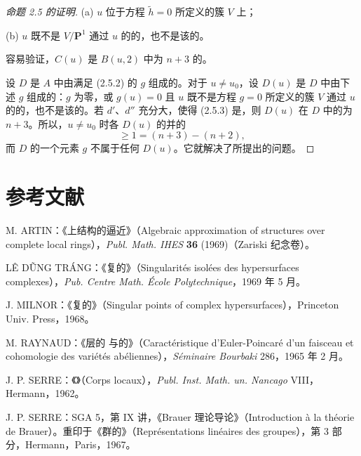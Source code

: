 \begin{proof}[命题 2.5 的证明]
(a) $u$ 位于方程 $\widetilde h=0$ 所定义的簇 $V$ 上；

(b) $u$ 既不是 $V/\mathbf P^1$ 通过 $u$ 的的，也不是该的。

容易验证，$C(u)$ 是 $B(u,2)$ 中为 $n+3$ 的。

设 $D$ 是 $A$ 中由满足 (2.5.2) 的 $g$ 组成的。对于 $u\ne u_0$，设 $D(u)$ 是 $D$ 中由下述 $g$ 组成的：$g$ 为零，或 $g(u)=0$ 且 $u$ 既不是方程 $g=0$ 所定义的簇 $V$ 通过 $u$ 的的，也不是该的。若 $d'$、$d''$ 充分大，使得 (2.5.3) 是，则 $D(u)$ 在 $D$ 中的为 $n+3$。所以，$u\ne u_0$ 时各 $D(u)$ 的并的
\[
\geq1=(n+3)-(n+2),
\]
而 $D$ 的一个元素 $g$ 不属于任何 $D(u)$。它就解决了所提出的问题。
\end{proof}

\section*{参考文献}
\begin{enumerate}[label={[\arabic*]}]
\item M. ARTIN：《上结构的逼近》（Algebraic approximation of structures over complete local rings），\textit{Publ. Math. IHES} \textbf{36} (1969)（Zariski 纪念卷）。
\item LÊ DŨNG TRÁNG：《复的》（Singularités isolées des hypersurfaces complexes），\textit{Pub. Centre Math. École Polytechnique}，1969 年 5 月。
\item J. MILNOR：《复的》（Singular points of complex hypersurfaces），Princeton Univ. Press，1968。
\item M. RAYNAUD：《层的 与的》（Caractéristique d'Euler-Poincaré d'un faisceau et cohomologie des variétés abéliennes），\textit{Séminaire Bourbaki} 286，1965 年 2 月。
\item J. P. SERRE：《》（Corps locaux），\textit{Publ. Inst. Math. un. Nancago} VIII，Hermann，1962。
\item J. P. SERRE：SGA 5，第 IX 讲，《Brauer 理论导论》（Introduction à la théorie de Brauer）。重印于《群的》（Représentations linéaires des groupes），第 3 部分，Hermann，Paris，1967。
\end{enumerate}
